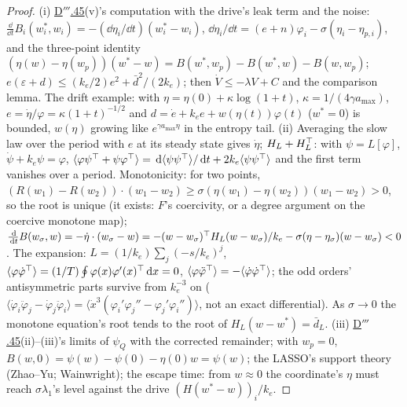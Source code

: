 \begin{proof}
(i) \hyperref[res:thmDppp:45]{D$'''$.45}(v)'s computation with the drive's leak term and the noise:
$\frac{\dd}{\dd t}B_i(w^*_i,w_i) = -(\dd\eta_i/\dd t)(w^*_i - w_i)$,
$\dd\eta_i/\dd t = (e + n)\varphi_i - \sigma(\eta_i - \eta_{p,i})$, and the three-point identity
$(\eta(w) - \eta(w_p))(w^* - w) = B(w^*,w_p) - B(w^*,w) - B(w,w_p)$;
$e(\varepsilon + d)\le(k_e/2)e^2 + \bar d^2/(2k_e)$; then $\dot V\le-\lambda V + C$ and the comparison lemma. The drift
example: with $\eta = \eta(0) + \kappa\log(1 + t)$, $\kappa = 1/(4\gamma a_{\max})$,
$e = \dot\eta/\varphi = \kappa(1 + t)^{-1/2}$ and $d = \dot e + k_ee + w(\eta(t))\varphi(t)$ ($w^* = 0$) is bounded,
$w(\eta)$ growing like $e^{\gamma a_{\max}\eta}$ in the entropy tail. (ii) Averaging the slow law over the period with
$e$ at its steady state gives $\dot\eta$; $H_L + H_L^\top$: with $\psi = L[\varphi]$, $\dot\psi + k_e\psi = \varphi$,
$\langle\varphi\psi^\top + \psi\varphi^\top\rangle = \,\mathrm{d}\langle\psi\psi^\top\rangle/\,\mathrm{d} t + 2k_e\langle\psi\psi^\top\rangle$ and
the first term vanishes over a period. Monotonicity: for two points,
$(R(w_1) - R(w_2))\cdot(w_1 - w_2)\ge\sigma(\eta(w_1) - \eta(w_2))(w_1 - w_2) > 0$, so the root is unique (it exists:
$F$'s coercivity, or a degree argument on the coercive monotone map);
$\frac{\,\mathrm{d}}{\,\mathrm{d} t}B(w_\sigma,w) = -\dot\eta\cdot(w_\sigma - w)
= -(w - w_\sigma)^\top H_L(w - w_\sigma)/k_e - \sigma(\eta - \eta_\sigma)(w - w_\sigma) < 0$. The expansion:
$L = (1/k_e)\sum_j(-s/k_e)^j$, $\langle\varphi\dot\varphi^\top\rangle = (1/T)\oint\varphi(x)\varphi'(x)^\top\,\mathrm{d} x = 0$,
$\langle\varphi\ddot\varphi^\top\rangle = -\langle\dot\varphi\dot\varphi^\top\rangle$; the odd orders' antisymmetric parts
survive from $k_e^{-3}$ on
($\langle\dot\varphi_i\ddot\varphi_j - \dot\varphi_j\ddot\varphi_i\rangle
= \langle\dot x^3(\varphi_i'\varphi_j'' - \varphi_j'\varphi_i'')\rangle$, not an exact differential). As $\sigma\to0$ the
monotone equation's root tends to the root of $H_L(w - w^*) = \bar d_L$. (iii)
\hyperref[res:thmDppp:45]{D$'''$.45}(ii)--(iii)'s limits of $\psi_Q$ with the corrected remainder; with $w_p = 0$,
$B(w,0) = \psi(w) - \psi(0) - \eta(0)w = \psi(w)$; the LASSO's support theory (Zhao--Yu; Wainwright); the escape time:
from $w\approx0$ the coordinate's $\eta$ must reach $\sigma\lambda_1$'s level against the drive
$(H(w^* - w))_i/k_e$.
\end{proof}
